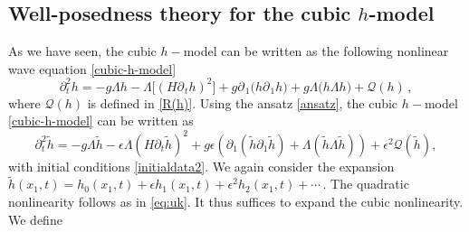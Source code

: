 \documentclass[11pt]{article}
\theoremstyle{plain}
\theoremstyle{definition}
\theoremstyle{definition}
\def\Q{{\mathcal Q}}
\def\p{\text{\bf\emph{p}}}
\def\bp{{\partial_1}}
\def\p{{\partial\hspace{1pt}}}
\def\comm#1#2{{\llbracket#1,#2\rrbracket}}
\def\smallexp#1{{\text{\small #1}}}
\def\dfrac#1#2{\smallexp{$\displaystyle{}\frac{#1}{#2}$}}
\def\hinit{h_{\operatorname{init}}}
\def\htinit{{\dot h}_{\operatorname{init}}}
\begin{document}
\subsection{Well-posedness theory for the cubic $h$-model}
As we have seen, the cubic $h-$model can be written as the following nonlinear wave equation \eqref{cubic-h-model}
$$
\partial_t^2 h=-g\Lambda h-\Lambda \big[(H\p_{\!t} h)^2\big] + g \p_{\!1} \big(h \p_{\!1} h \big) +g\Lambda \big(h \Lambda h \big)+ \mathcal{Q}(h)\,,
$$
where $\mathcal{Q}(h)$ is defined in \eqref{R(h)}. Using the ansatz \eqref{ansatz}, the cubic $h-$model \eqref{cubic-h-model} can be written as
\begin{equation}\label{eq:u2}
\partial_t^2 \widetilde{h}=-g\Lambda \widetilde{h}- \epsilon \Lambda(H\partial_t \widetilde{h})^2+g\epsilon\left(\bp(\widetilde{h}\bp \widetilde{h})+\Lambda(\widetilde{h}\Lambda \widetilde{h})\right)+\epsilon^2 \mathcal{Q}(\widetilde{h}),
\end{equation}
with initial conditions \eqref{initialdata2}.
We again  consider the expansion
$\widetilde{h}(x_1,t) = h_0(x_1,t) + \epsilon h_1(x_1,t) + \epsilon^2 h_2(x_1,t) + \cdots \,. $
The quadratic nonlinearity follows as in \eqref{eq:uk}.
It thus suffices to expand the cubic nonlinearity.
We define
\end{document}
